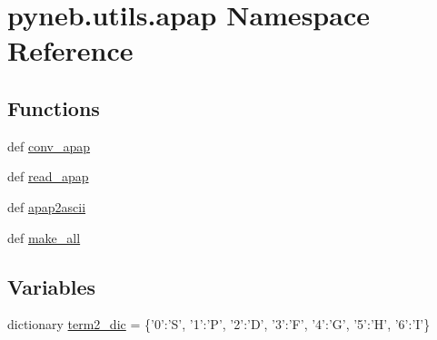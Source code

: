 \hypertarget{namespacepyneb_1_1utils_1_1apap}{\section{pyneb.\-utils.\-apap Namespace Reference}
\label{namespacepyneb_1_1utils_1_1apap}
}
\subsection*{Functions}
\begin{DoxyCompactItemize}
\item 
def \hyperlink{namespacepyneb_1_1utils_1_1apap_ac3d6e43ef2ad84632e9b5a101e115cb1}{conv\-\_\-apap}
\item 
def \hyperlink{namespacepyneb_1_1utils_1_1apap_ad24a246526c0913b752319c5a2846412}{read\-\_\-apap}
\item 
def \hyperlink{namespacepyneb_1_1utils_1_1apap_a4fccb2b8771d515b0be6f8a1921c0c58}{apap2ascii}
\item 
def \hyperlink{namespacepyneb_1_1utils_1_1apap_ac957f753a8fc1c667044b4324868753e}{make\-\_\-all}
\end{DoxyCompactItemize}
\subsection*{Variables}
\begin{DoxyCompactItemize}
\item 
dictionary \hyperlink{namespacepyneb_1_1utils_1_1apap_a3a64442bdcf9b3e98964d0f307c91659}{term2\-\_\-dic} = \{'0'\-:'S', '1'\-:'P', '2'\-:'D', '3'\-:'F', '4'\-:'G', '5'\-:'H', '6'\-:'I'\}
\end{DoxyCompactItemize}


